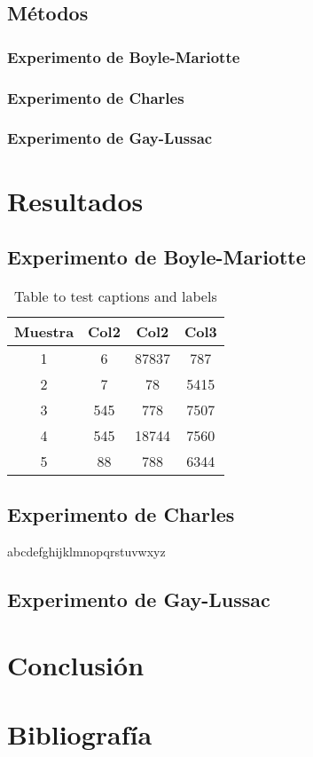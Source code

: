 \documentclass[11pt, letterpaper]{article}
\begin{document}
\subsection{Métodos}
\subsubsection{Experimento de Boyle-Mariotte}
\subsubsection{Experimento de Charles}
\subsubsection{Experimento de Gay-Lussac}
\section{Resultados}
\subsection{Experimento de Boyle-Mariotte}
\begin{table}[h!]
\centering
\begin{tabular}{||c c c c||} 
 \hline
 Muestra & Col2 & Col2 & Col3 \\ [0.5ex] 
 \hline\hline
 1 & 6 & 87837 & 787 \\ 
 2 & 7 & 78 & 5415 \\
 3 & 545 & 778 & 7507 \\
 4 & 545 & 18744 & 7560 \\
 5 & 88 & 788 & 6344 \\ [1ex] 
 \hline
\end{tabular}
\caption{Table to test captions and labels}
\label{table:1}
\end{table}
\subsection{Experimento de Charles}
abcdefghijklmnopqrstuvwxyz
\subsection{Experimento de Gay-Lussac}
\section{Conclusión}

\section{Bibliografía}
\printbibliography 
\end{document}
